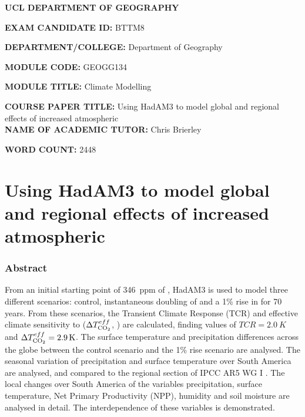\documentclass{article}
\begin{document}
\textbf{UCL DEPARTMENT OF GEOGRAPHY}\\[4cm]

\LARGE

\textbf{EXAM CANDIDATE ID:} BTTM8

\textbf{DEPARTMENT/COLLEGE:} Department of Geography

\textbf{MODULE CODE:} GEOGG134

\textbf{MODULE TITLE:} Climate Modelling

\textbf{COURSE PAPER TITLE:} Using HadAM3 to model global and regional effects of increased atmospheric  \\[3cm]

\textbf{NAME OF ACADEMIC TUTOR:} Chris Brierley

\textbf{WORD COUNT:} 2448

\normalsize

\newpage


\part*{Using HadAM3 to model global and regional effects of increased atmospheric }

\section*{Abstract}

From an initial starting point of \SI{346}{ppm} of , HadAM3 is used to model three different scenarios: control, instantaneous doubling of  and a 1\% rise in  for 70 years. From these scenarios, the Transient Climate Response (TCR) and effective climate sensitivity to  ($\Delta T^{eff}_{\ce{CO2}}$, ) are calculated, finding values of $TCR = \SI{2.0}{K}$ and $\Delta T^{eff}_{\ce{CO2}} = \SI{2.9}{K}$. The surface temperature and precipitation differences across the globe between the control scenario and the 1\% rise scenario are analysed. The seasonal variation of precipitation and surface temperature over South America are analysed, and compared to the regional section of IPCC AR5 WG I \parencite{ipcc2014wg1}. The local changes over South America of the variables precipitation, surface temperature, Net Primary Productivity (NPP), humidity and soil moisture are analysed in detail. The interdependence of these variables is demonstrated. %
\end{document}
